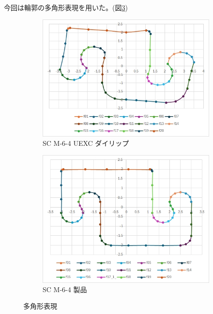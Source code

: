 \documentclass[report]{jlreq}
\begin{document}
今回は輪郭の多角形表現を用いた。({\small 図\ref{fig:polygon}})

\begin{figure}
  \centering
    \begin{subfigure}{0.45\columnwidth}
      \centering
      \includegraphics[width=\columnwidth]{D05_DieLip.jpg}
      \caption{SC M-6-4 UEXC ダイリップ}
      \label{fig:hidari}
    \end{subfigure}
    \hspace{5mm}
    \begin{subfigure}{0.45\columnwidth}
      \centering
      \includegraphics[width=\columnwidth]{SC_M-6-4_polygon.jpg}
      \caption{SC M-6-4 製品} 
      \label{fig:SC_M-6-4_polygon}
    \end{subfigure}
    \caption{多角形表現}
    \label{fig:polygon} 
\end{figure} 
\end{document}
